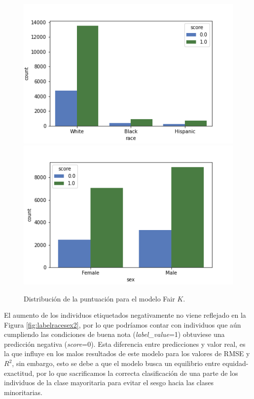 \documentclass[oneside,openright,titlepage,numbers=noenddot,openany,headinclude,footinclude=true,
cleardoublepage=empty,abstractoff,BCOR=5mm,paper=a4,fontsize=12pt,main=spanish]{scrreprt}
\begin{document}
\begin{figure}[H]
      \includegraphics[width=\linewidth]{images/score_fair_k_race_law.png}
    \endminipage\hfill
      \includegraphics[width=\linewidth]{images/score_fair_k_sex_law.png}
    \endminipage
     \caption{Distribución de la puntuación para el modelo Fair $K$.}
     \label{fig:scorefairk}
\end{figure}

El aumento de los individuos etiquetados negativamente no viene reflejado en la Figura \ref{fig:labelracesex2}, por lo que podríamos contar con individuos que aún cumpliendo las condiciones de buena nota (\textit{label\_value}=1) obtuviese una predicción negativa (\textit{score}=0). Esta diferencia entre predicciones y valor real, es la que influye en los malos resultados de este modelo para los valores de RMSE y $R^2$, sin embargo, esto se debe a que el modelo busca un equilibrio entre equidad-exactitud, por lo que sacrificamos la correcta clasificación de una parte de los individuos de la clase mayoritaria para evitar el sesgo hacia las clases minoritarias.
\end{document}
